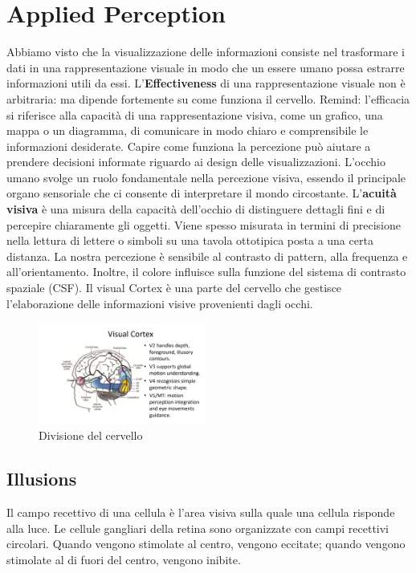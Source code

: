 \section{Applied Perception}
Abbiamo visto che la visualizzazione delle informazioni consiste nel trasformare i dati in una rappresentazione 
visuale in modo che un essere umano possa estrarre informazioni utili da essi.
L'\textbf{Effectiveness} di una rappresentazione visuale non è arbitraria: ma dipende fortemente su come funziona il cervello.
Remind: l'efficacia si riferisce alla capacità di una rappresentazione visiva, come un grafico, una mappa o un diagramma, di comunicare in modo chiaro e comprensibile le informazioni desiderate. 
Capire come funziona la percezione può aiutare a prendere decisioni informate riguardo ai design delle visualizzazioni.
L'occhio umano svolge un ruolo fondamentale nella percezione visiva, essendo il principale organo sensoriale che ci consente di interpretare il mondo circostante.
L'\textbf{acuità visiva} è una misura della capacità dell'occhio di distinguere dettagli fini e di percepire chiaramente gli oggetti.
Viene spesso misurata in termini di precisione nella lettura di lettere o simboli su una tavola ottotipica posta a una certa distanza.
La nostra percezione è sensibile al contrasto di pattern, alla frequenza e all'orientamento. Inoltre, il colore influisce sulla funzione del sistema di contrasto spaziale (CSF).
Il visual Cortex è una parte del cervello che gestisce l'elaborazione delle informazioni visive provenienti dagli occhi.
\begin{figure}[H]
    \centering
    \includegraphics[width=0.5\textwidth]{images/VisualCortex.png} 
    \caption{Divisione del cervello}
    \label{fig:immagine}
\end{figure}
\subsection{Illusions}
Il campo recettivo di una cellula è l'area visiva sulla quale una cellula risponde alla luce.
Le cellule gangliari della retina sono organizzate con campi recettivi circolari.
Quando vengono stimolate al centro, vengono eccitate; quando vengono stimolate al di fuori del centro, vengono inibite.

